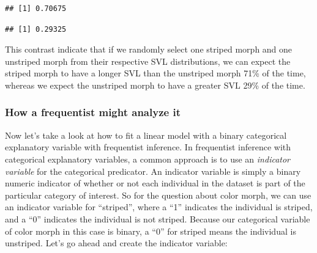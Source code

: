 \documentclass[
]{book}
\newenvironment{Shaded}{\begin{snugshade}}{\end{snugshade}}
\newcommand{\CommentTok}[1]{\textcolor[rgb]{0.56,0.35,0.01}{\textit{#1}}}
\newcommand{\DecValTok}[1]{\textcolor[rgb]{0.00,0.00,0.81}{#1}}
\newcommand{\FunctionTok}[1]{\textcolor[rgb]{0.13,0.29,0.53}{\textbf{#1}}}
\newcommand{\NormalTok}[1]{#1}
\newcommand{\OtherTok}[1]{\textcolor[rgb]{0.56,0.35,0.01}{#1}}
\newcommand{\SpecialCharTok}[1]{\textcolor[rgb]{0.81,0.36,0.00}{\textbf{#1}}}
\newcommand{\StringTok}[1]{\textcolor[rgb]{0.31,0.60,0.02}{#1}}
\begin{document}
\begin{verbatim}
## [1] 0.70675
\end{verbatim}

\begin{Shaded}
\end{Shaded}

\begin{verbatim}
## [1] 0.29325
\end{verbatim}

This contrast indicate that if we randomly select one striped morph and one unstriped morph from their respective SVL distributions, we can expect the striped morph to have a longer SVL than the unstriped morph 71\% of the time, whereas we expect the unstriped morph to have a greater SVL 29\% of the time.

\subsubsection{How a frequentist might analyze it}\label{how-a-frequentist-might-analyze-it}

Now let's take a look at how to fit a linear model with a binary categorical explanatory variable with frequentist inference. In frequentist inference with categorical explanatory variables, a common approach is to use an \emph{indicator variable} for the categorical predicator. An indicator variable is simply a binary numeric indicator of whether or not each individual in the dataset is part of the particular category of interest. So for the question about color morph, we can use an indicator variable for ``striped'', where a ``1'' indicates the individual is striped, and a ``0'' indicates the individual is not striped. Because our categorical variable of color morph in this case is binary, a ``0'' for striped means the individual is unstriped. Let's go ahead and create the indicator variable:

\begin{Shaded}
\end{Shaded}
\end{document}

